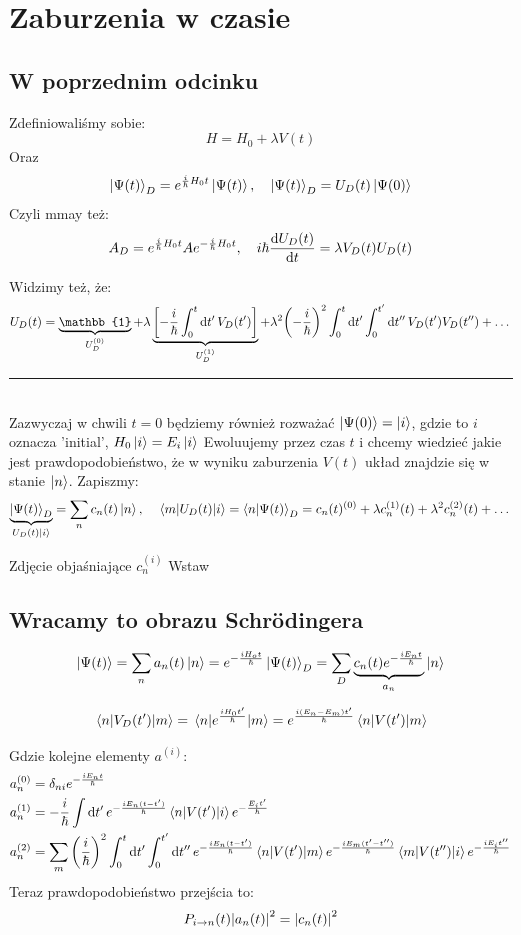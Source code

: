 \documentclass[12pt,a4paper]{report}
\newcommand{\com}[1]{{\color{red} #1}}
\newcommand{\psket}[1]{\ket{\Psi(#1)}}
\newcommand{\Id}{\mathbb{1}}
\newcommand{\linediv}{{\color{RubineRed} \rule{\linewidth}{0.5mm}}}
\newenvironment{lecture}[1]{\par\medskip
   \noindent\chapter{#1} \rmfamily}{\medskip}
\begin{document}
\begin{lecture}{Zaburzenia w czasie}
    \section{W poprzednim odcinku}
    Zdefiniowaliśmy sobie:
    \[
        H = H_0 + \lambda V(t)  
    \]
    Oraz 
    \[
        \psket{t}_D  = e^{\frac{i}{\hbar} H_0 t} \psket{t} \qc \psket{t}_D = U_D (t) \psket{0}
    \]
    Czyli mmay też:
    \[
       A_D = e^{\frac{i}{\hbar} H_0 t} A  e^{-\frac{i}{\hbar} H_0 t} \qc i \hbar \dv{U_D(t)}{t} = \lambda V_D(t) U_D(t)
    \]

    Widzimy też, że:
    \[
        U_D(t) = \underbrace{\Id}_{U_D^{(0)}} + \lambda \underbrace{\qty[- \frac{i}{\hbar} \int_0^t \dd{t'} V_D(t')]}_{U_D^{(1)}} + \lambda^2 \qty(-\frac{i}{\hbar})^2 \int_0^t \dd{t'} \int_0^{t'} \dd{t''} V_D(t') V_D(t'') + \dots 
    \]

    \linediv \\

    Zazwyczaj w chwili $t=0$ będziemy również rozważać $\psket{0} = \ket{i}$, gdzie to $i$ oznacza 'initial', $H_0 \ket{i} = E_i \ket{i}$
    Ewoluujemy przez czas $t$ i chcemy wiedzieć jakie jest prawdopodobieństwo, że w wyniku zaburzenia $V(t)$ układ znajdzie się w stanie $\ket{n}$. Zapiszmy:
    \[
        \underbrace{\psket{t}_D}_{U_D(t) \ket{i}} = \sum_n c_n(t) \ket{n} \qc  \mel{m}{U_D(t)}{i} = \braket{n}{\Psi(t)}_D = c_n(t)^{(0)} + \lambda c_n^{(1)}(t) + \lambda^2 c_n^{(2)}(t) + \dots
    \]

    Zdjęcie objaśniające $c_n^{(i)}$ \com{Wstaw}

    \section{Wracamy to obrazu Schrödingera}
    \[
      \psket{t} = \sum_n a_n(t) \ket{n} = e^{- \frac{i H_o t}{\hbar}} \psket{t}_D = \sum_D \underbrace{c_n(t) e^{-\frac{i E_n t}{\hbar}}}_{a_n} \ket{n}  
    \]

    \[
        \mel{n}{V_D(t')}{m} = \mel{n}{e^{\frac{i H_0 t'}{\hbar}}}{m} = e^{\frac{i (E_n - E_m) t'}{\hbar}} \mel{n}{V(t')}{m} 
    \]

    Gdzie kolejne elementy $a^{(i)}$:
    \begin{align*}
        a_n^{(0)} &= \delta_{n i} e^{-\frac{i E_n t}{\hbar}}\\
        a_n^{(1)} &= - \frac{i}{\hbar} \int \dd{t'} e^{-\frac{i E_n (t-t')}{\hbar}} \mel{n}{V(t')}{i} e^{-\frac{E_i t'}{\hbar}} \\
        a_n^{(2)} &=  \sum_m \qty(\frac{i}{\hbar})^2 \int_0^t \dd{t'} \int_0^{t'} \dd{t''} e^{-\frac{i E_n (t - t')}{\hbar}} \mel{n}{V(t')}{m} e^{- \frac{i E_m (t' - t'')}{\hbar}} \mel{m}{V(t'')}{i} e^{- \frac{i E_i t''}{\hbar}}
    \end{align*}
    Teraz prawdopodobieństwo przejścia to:
    \[
        P_{i \to n} (t) \abs{a_n(t)}^2 = \abs{c_n(t)}^2  
    \]


\end{lecture}
\end{document}
